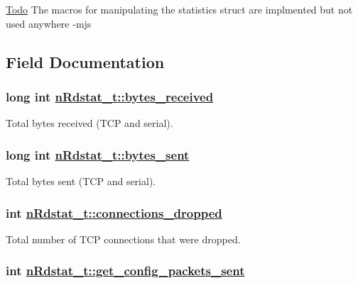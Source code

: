 \begin{Desc}
\item[\hyperlink{todo__todo000007}{Todo}]The macros for manipulating the statistics struct are implmented but not used anywhere -mjs \end{Desc}




\subsection{Field Documentation}
\hypertarget{structnRdstat__t_2b421bcc473a30ddf8044bd26482e07d}{
\subsubsection[bytes\_\-received]{\setlength{\rightskip}{0pt plus 5cm}long int \hyperlink{structnRdstat__t_2b421bcc473a30ddf8044bd26482e07d}{n\-Rdstat\_\-t::bytes\_\-received}}}
\label{structnRdstat__t_2b421bcc473a30ddf8044bd26482e07d}


Total bytes received (TCP and serial). \hypertarget{structnRdstat__t_1b3082b4f7c51e187c43ef4964cf5bb3}{
\subsubsection[bytes\_\-sent]{\setlength{\rightskip}{0pt plus 5cm}long int \hyperlink{structnRdstat__t_1b3082b4f7c51e187c43ef4964cf5bb3}{n\-Rdstat\_\-t::bytes\_\-sent}}}
\label{structnRdstat__t_1b3082b4f7c51e187c43ef4964cf5bb3}


Total bytes sent (TCP and serial). \hypertarget{structnRdstat__t_7e77d4adf8d902e944de8ed14bc4691e}{
\subsubsection[connections\_\-dropped]{\setlength{\rightskip}{0pt plus 5cm}int \hyperlink{structnRdstat__t_7e77d4adf8d902e944de8ed14bc4691e}{n\-Rdstat\_\-t::connections\_\-dropped}}}
\label{structnRdstat__t_7e77d4adf8d902e944de8ed14bc4691e}


Total number of TCP connections that were dropped. \hypertarget{structnRdstat__t_fa233a9c22104e9ef722143968f18d32}{
\subsubsection[get\_\-config\_\-packets\_\-sent]{\setlength{\rightskip}{0pt plus 5cm}int \hyperlink{structnRdstat__t_fa233a9c22104e9ef722143968f18d32}{n\-Rdstat\_\-t::get\_\-config\_\-packets\_\-sent}}}
\label{structnRdstat__t_fa233a9c22104e9ef722143968f18d32}


